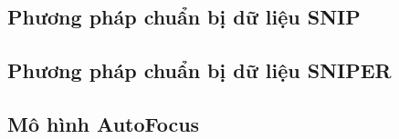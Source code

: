{    \subsection{Phương pháp chuẩn bị dữ liệu SNIP}
    
    \snip

    \subsection{Phương pháp chuẩn bị dữ liệu SNIPER }
    
    \sniper

    \subsection{Mô hình AutoFocus }
    
    \autofocus
}